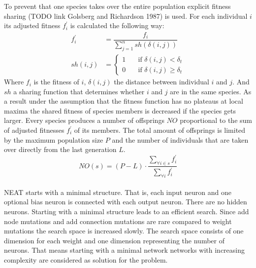 To prevent that one species takes over the entire population explicit fitness sharing (TODO link Golsberg and Richardson 1987) is used. For each individual $i$ its adjusted fitness $f_{i}^{'}$ is calculated the following way:
\begin{align*} 
f_{i}^{'}&=\dfrac{f_i}{\displaystyle\sum_{j=1}^{n} sh(\delta(i,j)) }\\
sh(i,j) &= \begin{cases}
1 & \quad \text{if } \delta(i,j) < \delta_t \\
0 & \quad \text{if } \delta(i,j) \geq \delta_t
\end{cases}
\end{align*}
Where $f_i$ is the fitness of $i$, $\delta(i,j)$ the distance between individual $i$ and $j$. And $sh$ a sharing function that determines whether $i$ and $j$ are in the same species.
As a result under the assumption that the fitness function has no plateaus at local maxima the shared fitness of species members is decreased if the species gets larger. Every species produces a number of offsprings $NO$ proportional to the sum of adjusted fitnesses $f_{i}^{'}$ of its members. The total amount of offsprings is limited by the maximum population size $P$ and the number of individuals that are taken over directly from the last generation $L$.
\begin{equation*} 
NO(s) = (P-L)\cdot\dfrac{\displaystyle\sum_{\forall i \in s} f_{i}^{'}}{\displaystyle\sum_{\forall i } f_{i}^{'}}
\end{equation*}
\\ NEAT starts with a minimal structure. That is, each input neuron and one optional bias neuron is connected with each output neuron. There are no hidden neurons. Starting with a minimal structure leads to an efficient search. Since add node mutations and add connection mutations are rare compared to weight mutations the search space is increased slowly. The search space consists of one dimension for each weight and one dimension representing the number of neurons. That means starting with a minimal network networks with increasing complexity are considered as solution for the problem.


 
  
